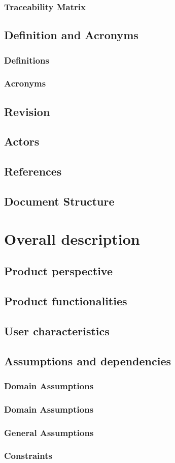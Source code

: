 \documentclass[12pt]{article}
\begin{document}
	\subsubsection{Traceability Matrix}
	
	\subsection{Definition and Acronyms}
	\subsubsection{Definitions}
	\subsubsection{Acronyms}
	\subsection{Revision}
	\subsection{Actors}
	
	\subsection{References}
	
	\subsection{Document Structure}
	\clearpage
	\section{Overall description}
	\subsection{Product perspective}
	
	\subsection{Product functionalities}
	\subsection{User characteristics}
	
	\subsection{Assumptions and dependencies}
	\subsubsection{Domain Assumptions}
	
	
	\subsubsection{Domain Assumptions}
	
	\subsubsection{General Assumptions}
	
	\subsubsection{Constraints}
	
	\clearpage
\end{document}
